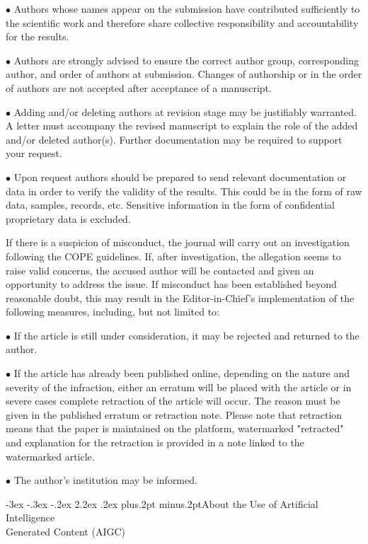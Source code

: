 \documentclass[twoside]{article}
\makeatletter
\def\section{\@startsection{section}{1}{\z@}%
 {-3ex \@plus -.3ex \@minus -.2ex}%
 {2.2ex \@plus.2ex}%
{\normalfont\normalsize\protect\baselineskip=14.5pt plus.2pt minus.2pt\bfseries}}
\makeatother
\begin{document}
\begin{multicols}{2}
$\bullet$ Authors whose names appear on the submission have contributed sufficiently to the scientific work and therefore share collective responsibility and accountability for the results.

$\bullet$ Authors are strongly advised to ensure the correct author group, corresponding author, and order of authors at submission. Changes of authorship or in the order of authors are not accepted after acceptance of a manuscript.

$\bullet$ Adding and/or deleting authors at revision stage may be justifiably warranted. A letter must accompany the revised manuscript to explain the role of the added and/or deleted author(s). Further documentation may be required to support your request.

$\bullet$ Upon request authors should be prepared to send relevant documentation or data in order to verify the validity of the results. This could be in the form of raw data, samples, records, etc. Sensitive information in the form of confidential proprietary data is excluded.

If there is a suspicion of misconduct, the journal will carry out an investigation following the COPE guidelines. If, after investigation, the allegation seems to raise valid concerns, the accused author will be contacted and given an opportunity to address the issue. If misconduct has been established beyond reasonable doubt, this may result in the Editor-in-Chief's implementation of the following measures, including, but not limited to:

$\bullet$ If the article is still under consideration, it may be rejected and returned
to the author.

$\bullet$ If the article has already been published online, depending on the nature
and severity of the infraction, either an erratum will be placed with the
article or in severe cases complete retraction of the article will occur.
The reason must be given in the published erratum or retraction note. Please
note that retraction means that the paper is maintained on the platform,
watermarked "retracted" and explanation for the retraction is provided in a
note linked to the watermarked article.

$\bullet$ The author's institution may be informed.

\section{About the Use of Artificial Intelligence\\ Generated Content (AIGC)}


\end{multicols}
\end{document}
